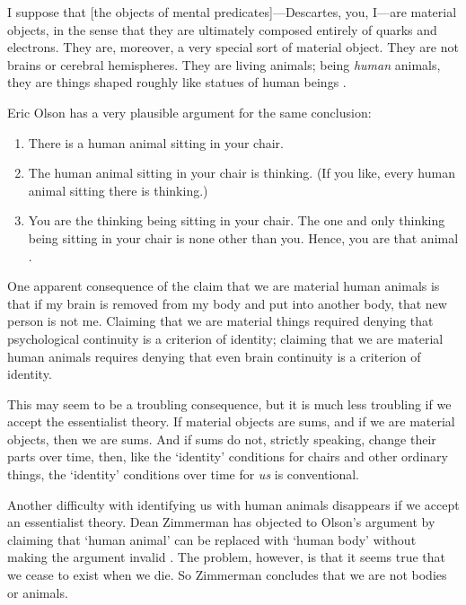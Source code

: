 \documentclass[11pt]{article}
\newenvironment{squote}{%
\begin{spacing}{1}
\begin{list}{}{%
\setlength{\labelwidth}{0pt}%
\rightmargin\leftmargin%
}
\item\relax
}{%
\end{list}%
\end{spacing}
}
\begin{document}
\begin{spacing}{1.5}
\begin{squote}
I suppose that [the objects of mental predicates]---Descartes, you,
I---are material objects, in the sense that they are ultimately
composed entirely of quarks and electrons.  They are, moreover, a very
special sort of material object.  They are not brains or cerebral
hemispheres.  They are living animals; being {\em human} animals, they
are things shaped roughly like statues of human beings
\citeyearpar[6]{inwagen1995}.
\end{squote}

Eric Olson has a very plausible argument for the same conclusion:

\begin{enumerate}
  \item There is a human animal sitting in your chair.
  \item The human animal sitting in your chair is thinking. (If you
    like, every human animal sitting there is thinking.)
  \item You are the thinking being sitting in your chair. The one and
    only thinking being sitting in your chair is none other than
    you. Hence, you are that animal \citeyearpar[354]{olson2003a}.
\end{enumerate}

One apparent consequence of the claim that we are material human
animals is that if my brain is removed from my body and put into
another body, that new person is not me.  Claiming that we are
material things required denying that psychological continuity is a
criterion of identity; claiming that we are material human animals
requires denying that even brain continuity is a criterion of
identity.

This may seem to be a troubling consequence, but it is much less
troubling if we accept the essentialist theory.  If material objects
are sums, and if we are material objects, then we are sums.  And if
sums do not, strictly speaking, change their parts over time, then,
like the `identity' conditions for chairs and other ordinary things,
the `identity' conditions over time for {\em us} is conventional.

Another difficulty with identifying us with human animals disappears
if we accept an essentialist theory.  Dean Zimmerman has objected to
Olson's argument by claiming that `human animal' can be replaced with
`human body' without making the argument invalid
\citeyearpar[24]{zimmerman2008a}.  The problem, however, is that it
seems true that we cease to exist when we die.  So Zimmerman concludes
that we are not bodies or animals.


\end{spacing}
\end{document}
